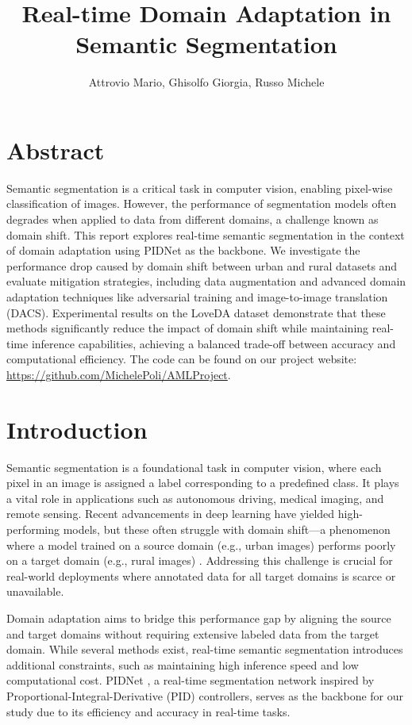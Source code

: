 \documentclass{article}
\title{Real-time Domain Adaptation in Semantic Segmentation}
\author{Attrovio Mario, Ghisolfo Giorgia, Russo Michele}
\begin{document}
	\maketitle
	
	\begin{multicols}{2}
		
		\section{Abstract}
		Semantic segmentation is a critical task in computer vision, enabling pixel-wise classification of images. However, the performance of segmentation models often degrades when applied to data from different domains, a challenge known as domain shift. This report explores real-time semantic segmentation in the context of domain adaptation using PIDNet as the backbone. We investigate the performance drop caused by domain shift between urban and rural datasets and evaluate mitigation strategies, including data augmentation and advanced domain adaptation techniques like adversarial training and image-to-image translation (DACS). Experimental results on the LoveDA dataset demonstrate that these methods significantly reduce the impact of domain shift while maintaining real-time inference capabilities, achieving a balanced trade-off between accuracy and computational efficiency. The code can be found on our project website: \url{https://github.com/MichelePoli/AMLProject}.
		
		\section{Introduction}
		Semantic segmentation is a foundational task in computer vision, where each pixel in an image is assigned a label corresponding to a predefined class. It plays a vital role in applications such as autonomous driving, medical imaging, and remote sensing. Recent advancements in deep learning have yielded high-performing models, but these often struggle with domain shift—a phenomenon where a model trained on a source domain (e.g., urban images) performs poorly on a target domain (e.g., rural images) \cite{loveda2021}. Addressing this challenge is crucial for real-world deployments where annotated data for all target domains is scarce or unavailable.
		
		Domain adaptation aims to bridge this performance gap by aligning the source and target domains without requiring extensive labeled data from the target domain. While several methods exist, real-time semantic segmentation introduces additional constraints, such as maintaining high inference speed and low computational cost. PIDNet \cite{pidnet2023}, a real-time segmentation network inspired by Proportional-Integral-Derivative (PID) controllers, serves as the backbone for our study due to its efficiency and accuracy in real-time tasks.
		

\end{multicols}
\end{document}
